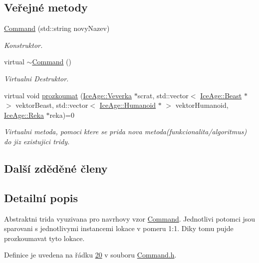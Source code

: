 \subsection*{Veřejné metody}
\begin{DoxyCompactItemize}
\item 
\hyperlink{classIceAge_1_1Command_a451edb7cb24df79568a193929293041d}{Command} (std\+::string novy\+Nazev)
\begin{DoxyCompactList}\small\item\em Konstruktor. \end{DoxyCompactList}\item 
virtual \hyperlink{classIceAge_1_1Command_a604f37ab9196a5a59a5b6e61aa1efc35}{$\sim$\+Command} ()
\begin{DoxyCompactList}\small\item\em Virtualni Destruktor. \end{DoxyCompactList}\item 
virtual void \hyperlink{classIceAge_1_1Command_a0466e88c0c9e2a44618c12f6c88b76fe}{prozkoumat} (\hyperlink{classIceAge_1_1Veverka}{Ice\+Age\+::\+Veverka} $\ast$scrat, std\+::vector$<$ \hyperlink{classIceAge_1_1Beast}{Ice\+Age\+::\+Beast} $\ast$ $>$ vektor\+Beast, std\+::vector$<$ \hyperlink{classIceAge_1_1Humanoid}{Ice\+Age\+::\+Humanoid} $\ast$ $>$ vektor\+Humanoid, \hyperlink{classIceAge_1_1Reka}{Ice\+Age\+::\+Reka} $\ast$reka)=0
\begin{DoxyCompactList}\small\item\em Virtualni metoda, pomoci ktere se prida nova metoda(funkcionalita/algoritmus) do jiz existujici tridy. \end{DoxyCompactList}\end{DoxyCompactItemize}
\subsection*{Další zděděné členy}


\subsection{Detailní popis}
Abstraktni trida vyuzivana pro navrhovy vzor \hyperlink{classIceAge_1_1Command}{Command}. Jednotlivi potomci jsou sparovani s jednotlivymi instancemi lokace v pomeru 1\+:1. Diky tomu pujde prozkoumavat tyto lokace. 

Definice je uvedena na řádku \hyperlink{Command_8h_source_l00020}{20} v souboru \hyperlink{Command_8h_source}{Command.\+h}.



